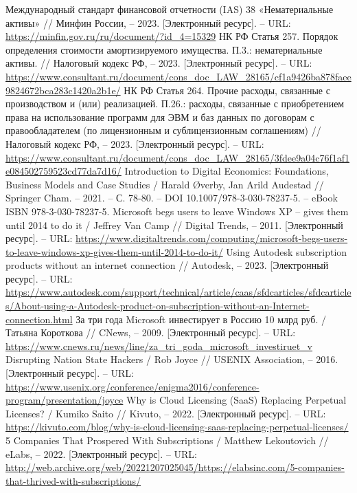 \documentclass{article}
\begin{document}
\begin{thebibliography}{2}
 Международный стандарт финансовой отчетности (IAS) 38 «Нематериальные активы» // Минфин России, – 2023. [Электронный ресурс]. – URL: \url{https://minfin.gov.ru/ru/document/?id\_4=15329}
 НК РФ Статья 257. Порядок определения стоимости амортизируемого имущества. П.3.: нематериальные активы. // Налоговый кодекс РФ, – 2023. [Электронный ресурс]. – URL: \url{https://www.consultant.ru/document/cons\_doc\_LAW\_28165/cf1a9426ba878faee9824672bca283c1420a2b1e/}
 НК РФ Статья 264. Прочие расходы, связанные с производством и (или) реализацией. П.26.: расходы, связанные с приобретением права на использование программ для ЭВМ и баз данных по договорам с правообладателем (по лицензионным и сублицензионным соглашениям) // Налоговый кодекс РФ, – 2023. [Электронный ресурс]. – URL: \url{https://www.consultant.ru/document/cons\_doc\_LAW\_28165/3fdee9a04c76f1af1e084502759523cd77da7d16/}
 Introduction to Digital Economics: Foundations, Business Models and Case Studies / Harald Øverby, Jan Arild Audestad // Springer Cham. – 2021. – С. 78-80. – DOI 10.1007/978-3-030-78237-5. – eBook ISBN 978-3-030-78237-5.
 Microsoft begs users to leave Windows XP – gives them until 2014 to do it / Jeffrey Van Camp // Digital Trends, – 2011. [Электронный ресурс]. – URL: \url{https://www.digitaltrends.com/computing/microsoft-begs-users-to-leave-windows-xp-gives-them-until-2014-to-do-it/}
 Using Autodesk subscription products without an internet connection // Autodesk, – 2023. [Электронный ресурс]. – URL: \url{https://www.autodesk.com/support/technical/article/caas/sfdcarticles/sfdcarticles/About-using-a-Autodesk-product-on-subscription-without-an-Internet-connection.html}
 За три года Microsoft инвестирует в Россию 10 млрд руб. / Татьяна Короткова // CNews, – 2009. [Электронный ресурс]. – URL: \url{https://www.cnews.ru/news/line/za\_tri\_goda\_microsoft\_investiruet\_v}
 Disrupting Nation State Hackers / Rob Joyce // USENIX Association, – 2016. [Электронный ресурс]. – URL: \url{https://www.usenix.org/conference/enigma2016/conference-program/presentation/joyce}
 Why is Cloud Licensing (SaaS) Replacing Perpetual Licenses? / Kumiko Saito // Kivuto, – 2022. [Электронный ресурс]. – URL: \url{https://kivuto.com/blog/why-is-cloud-licensing-saas-replacing-perpetual-licenses/}
 5 Companies That Prospered With Subscriptions / Matthew Lekoutovich // eLabs, – 2022. [Электронный ресурс]. – URL: \url{http://web.archive.org/web/20221207025045/https://elabsinc.com/5-companies-that-thrived-with-subscriptions/}

\end{thebibliography}
\end{document}

